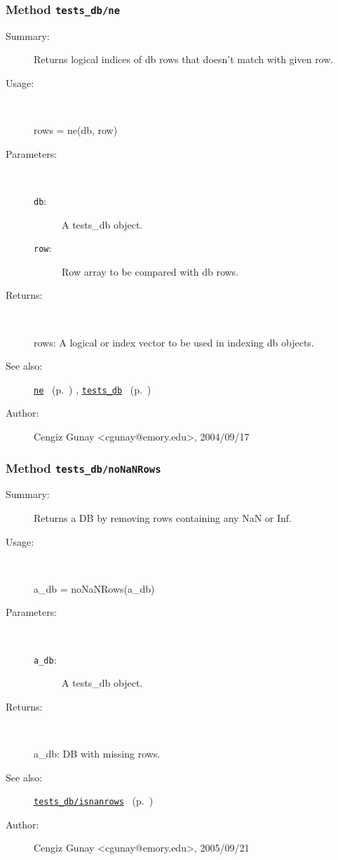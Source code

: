 \subsubsection[Method \texttt{ne}]{Method \texttt{tests\_db/ne}}%
%
\label{ref_tests_db__ne}%
\hypertarget{ref_tests_db__ne}{}%
\begin{description}
\item[Summary:]Returns logical indices of db rows that doesn't match with given row.
%
\item[Usage:]~%
\begin{lyxcode}%
rows = ne(db, row)
%
\end{lyxcode}%
%
%
\item[Parameters:]~
\begin{description}%
\item[\texttt{db}:]
 A tests\_db object.
\item[\texttt{row}:]
 Row array to be compared with db rows.
\end{description}%
%
\item[Returns:
]~

	rows: A logical or index vector to be used in indexing db objects. 
%
%
\item[See also:]%
\hyperlink{ref_ne}{\texttt{ne}}%
\ (p.~\pageref{ref_ne})%
%
, \hyperlink{ref_tests_db}{\texttt{tests\_db}}%
\ (p.~\pageref{ref_tests_db})%
%
%
\item[Author:]%
Cengiz Gunay <cgunay@emory.edu>, 2004/09/17
%
\end{description}
\methodline%
\subsubsection[Method \texttt{noNaNRows}]{Method \texttt{tests\_db/noNaNRows}}%
%
\label{ref_tests_db__noNaNRows}%
\hypertarget{ref_tests_db__noNaNRows}{}%
\begin{description}
\item[Summary:]Returns a DB by removing rows containing any NaN or Inf.
%
\item[Usage:]~%
\begin{lyxcode}%
a\_db = noNaNRows(a\_db)
%
\end{lyxcode}%
%
%
\item[Parameters:]~
\begin{description}%
\item[\texttt{a\_db}:]
 A tests\_db object.
\end{description}%
%
\item[Returns:
]~

	a\_db: DB with missing rows.
%
%
\item[See also:]%
\hyperlink{ref_tests_db__isnanrows}{\texttt{tests\_db/isnanrows}}%
\ (p.~\pageref{ref_tests_db__isnanrows})%
%
%
\item[Author:]%
Cengiz Gunay <cgunay@emory.edu>, 2005/09/21
%
\end{description}
\methodline%
